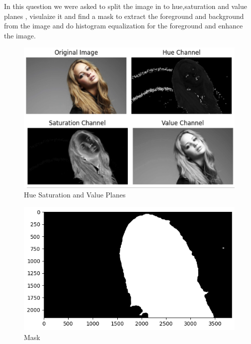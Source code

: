 \documentclass[11pt,a4paper]{article}
\begin{document}
In this question we were asked to split the image in to hue,saturation and value planes , visulaize it and find a mask to extract the foreground and background from the image and do histogram equalization for the foreground and enhance the image.

{\begin{figure}[h]
    \centering
    \includegraphics[width=1\linewidth]{images/6-1.png}
    \caption{Hue Saturation and Value Planes}
\end{figure}}

{\begin{figure}[h]
    \centering
    \includegraphics[width=1\linewidth]{images/6-2.png}
    \caption{Mask}
\end{figure}}

\newpage

\lstset{style=mystyle}

\end{document}
